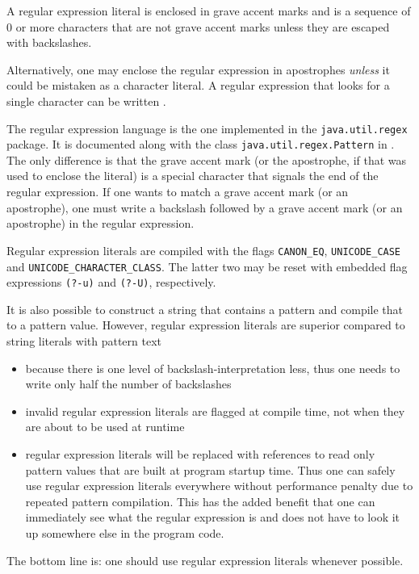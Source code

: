 \begin{flushleft}
  
\alt {}
\end{flushleft}

A regular expression literal is enclosed in grave accent marks and is a sequence of 0 or more characters that are not grave accent marks unless they are escaped with backslashes.

Alternatively, one may enclose the regular expression in apostrophes \emph{unless} it could be mistaken as a character literal. A regular expression that looks for a single character  can be written .

The regular expression language is the one implemented in the \texttt{java.util.regex} package. It is documented along with the class \texttt{java.util.regex.Pattern} in \cite{apidoc}.
The only difference is that the grave accent mark (or the apostrophe, if that was used to enclose the literal) is a special character that signals the end of the regular expression.
If one wants to match a grave accent mark (or an apostrophe), one must write a backslash followed by a grave accent mark (or an apostrophe) in the regular expression.

Regular expression literals are compiled with the flags \texttt{CANON\_EQ}, \texttt{UNICODE\_CASE} and \texttt{UNICODE\_CHARACTER\_CLASS}. The latter two may be reset with embedded flag expressions \texttt{(?-u)} and \texttt{(?-U)}, respectively.


It is also possible to construct a string that contains a pattern and compile that to a pattern value. However, regular expression  literals are superior compared to string literals with pattern text
\begin{itemize}
\item because there is one level of backslash-interpretation less, thus one needs to write only half the number of backslashes
\item invalid regular expression literals are flagged at compile time, not when they are about to be used at runtime
\item regular expression literals will be replaced with references to read only pattern values that are built at program startup time. Thus one can safely use regular expression literals everywhere without performance penalty due to repeated pattern compilation. This has the added benefit that one can immediately see what the regular expression is and does not have to look it up somewhere else in the program code.
\end{itemize}
The bottom line is: one should use regular expression literals whenever possible.

